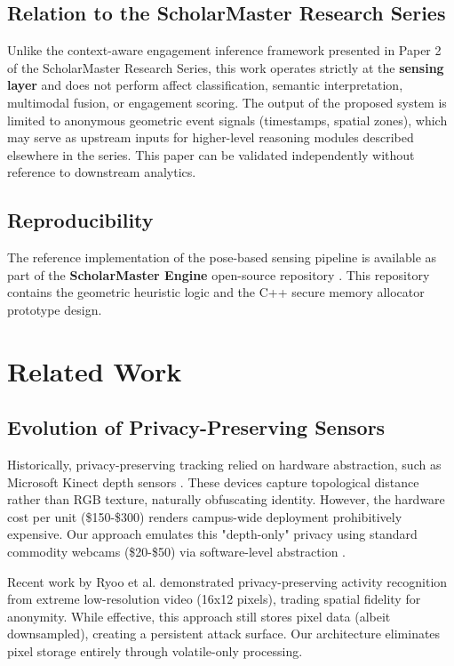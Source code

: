 \documentclass[conference]{IEEEtran}
\begin{document}
\subsection{Relation to the ScholarMaster Research Series}
Unlike the context-aware engagement inference framework presented in Paper 2 of the ScholarMaster Research Series, this work operates strictly at the \textbf{sensing layer} and does not perform affect classification, semantic interpretation, multimodal fusion, or engagement scoring. The output of the proposed system is limited to anonymous geometric event signals (timestamps, spatial zones), which may serve as upstream inputs for higher-level reasoning modules described elsewhere in the series. This paper can be validated independently without reference to downstream analytics.

\subsection{Reproducibility}
The reference implementation of the pose-based sensing pipeline is available as part of the \textbf{ScholarMaster Engine} open-source repository \cite{scholarmaster_repo}. This repository contains the geometric heuristic logic and the C++ secure memory allocator prototype design.

\section{Related Work}

\subsection{Evolution of Privacy-Preserving Sensors}
Historically, privacy-preserving tracking relied on hardware abstraction, such as Microsoft Kinect depth sensors \cite{b9}. These devices capture topological distance rather than RGB texture, naturally obfuscating identity. However, the hardware cost per unit (\$150-\$300) renders campus-wide deployment prohibitively expensive. Our approach emulates this "depth-only" privacy using standard commodity webcams (\$20-\$50) via software-level abstraction \cite{b7}.

Recent work by Ryoo et al. \cite{b5} demonstrated privacy-preserving activity recognition from extreme low-resolution video (16x12 pixels), trading spatial fidelity for anonymity. While effective, this approach still stores pixel data (albeit downsampled), creating a persistent attack surface. Our architecture eliminates pixel storage entirely through volatile-only processing.
\end{document}
